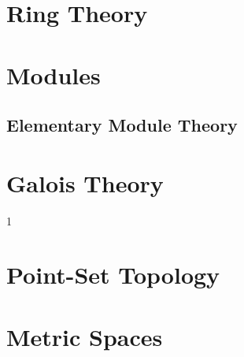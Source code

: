\documentclass{book}                                                           %
\newcommand*{\TOPPATH}{books}
\newcommand*{\PARPATH}{\TOPPATH/}
\newcommand*{\PATH}{\TOPPATH/}
\newcounter{endpage}
\def\compiletopology{0}
\begin{document}
            \part{Ring Theory}
                \renewcommand{\PARPATH}{\TOPPATH/Algebra/Ring_Theory}
                
            \part{Modules}
                \renewcommand{\PARPATH}{\TOPPATH/Algebra/Modules}
                \chapter{Elementary  Module Theory}
                    \renewcommand{\PATH}{\PARPATH/Elementary_Properties}
                    \label{chapt:Elementary_Module_Theory}%
                    
            \part{Galois Theory}
                \renewcommand{\PARPATH}{\TOPPATH/Algebra/Galois_Theory}
                
        \clearpage
        \setcounter{endpage}{\thepage}
    \fi

    \if\compiletopology1
            \label{book:Topology}%
            \renewcommand{\PATH}{\TOPPATH/Topology}
            \setcounter{page}{\value{endpage}}
            \part{Point-Set Topology}
                
                
            \part{Metric Spaces}
\end{document}
